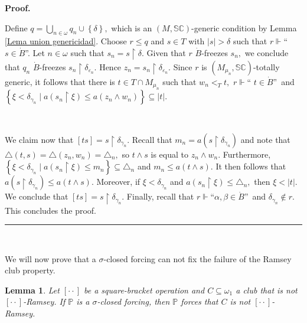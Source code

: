 \documentclass{article}
\newtheorem{lemma}[theorem]{Lemma}
\newenvironment{proof}[1][Proof]{\noindent\textbf{#1.} }{\ \rule{0.5em}{0.5em}}
\begin{document}
\begin{proof}
\qquad\ \qquad\ \qquad\ 

Define $q=\bigcup\limits_{n\in\omega}q_{n}\cup\left\{  \delta\right\}  ,$
which is an $(M,\mathbb{SC})$-generic condition by Lemma
\ref{Lema union genericidad}. Choose $r\leq q$ and $s\in T$ with $\left\vert
s\right\vert >\delta$ such that $r\Vdash$\textquotedblleft$s\in\dot{B}%
$\textquotedblright. Let $n\in\omega$ such that $s_{n}=s\upharpoonright
\delta.$ Given that $r$ $\dot{B}$-freezes $s_{n},$ we conclude that $q_{n}$
$\dot{B}$-freezes $s_{n}\upharpoonright\delta_{\varepsilon_{n}}.$ Hence
$z_{n}=s_{n}\upharpoonright\delta_{\varepsilon_{n}}.$ Since $r$ is
$(M_{\mu_{n}},\mathbb{SC})$-totally generic, it follows that there is $t\in
T\cap M_{\mu_{n}}$ such that $w_{n}<_{T}t,$ $r\Vdash$\textquotedblleft%
$t\in\dot{B}$\textquotedblright\ and $\left\{  \xi<\delta_{\gamma_{n}}\mid
a\left(  s_{n}\upharpoonright\xi\right)  \leq a\left(  z_{n}\wedge
w_{n}\right)  \right\}  \subseteq\left\vert t\right\vert .$

\qquad\ \qquad\ \ \ \qquad\ \ 

We claim now that $\left[  ts\right]  =s\upharpoonright\delta_{\gamma_{n}}.$
Recall that $m_{n}=a\left(  s\upharpoonright\delta_{\gamma_{n}}\right)  $ and
note that $\triangle\left(  t,s\right)  =\triangle\left(  z_{n},w_{n}\right)
=\triangle_{n},$ so $t\wedge s$ is equal to $z_{n}\wedge w_{n}.$ Furthermore,
$\left\{  \xi<\delta_{\gamma_{n}}\mid a\left(  s_{n}\upharpoonright\xi\right)
\leq m_{n}\right\}  \subseteq\triangle_{n}$ and $m_{n}\leq a\left(  t\wedge
s\right)  .$ It then follows that $a\left(  s\upharpoonright\delta_{\gamma
_{n}}\right)  \leq a\left(  t\wedge s\right)  $. Moreover, if $\xi
<\delta_{\gamma_{n}}$ and $a\left(  s_{n}\upharpoonright\xi\right)
\leq\triangle_{n},$ then $\xi<\left\vert t\right\vert .$ We conclude that
$\left[  ts\right]  =s\upharpoonright\delta_{\gamma_{n}}.$ Finally, recall
that $r\Vdash$\textquotedblleft$\alpha,\beta\in\dot{B}$\textquotedblright\ and
$\delta_{\gamma_{n}}\notin r.$ This concludes the proof.
\end{proof}

\qquad\qquad\ \ \ \ \ \ \qquad\ \ \ \ \ \qquad\ \ \ \ \ \ \qquad\ \ \ \ \ 

We will now prove that a $\sigma$-closed forcing can not fix the failure of
the Ramsey club property.

\begin{lemma}
Let $[\cdot\cdot]$ be a square-bracket operation and $C\subseteq\omega_{1}$ a
club that is not $[\cdot\cdot]$-Ramsey. If $\mathbb{P}$ is a $\sigma$-closed
forcing, then $\mathbb{P}$ forces that $C$ is not $[\cdot\cdot]$-Ramsey.
\label{Lemma sigma closed no corrige}
\end{lemma}
\end{document}
